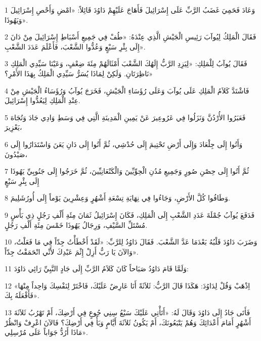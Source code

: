 \par 1 وَعَادَ فَحَمِيَ غَضَبُ الرَّبِّ عَلَى إِسْرَائِيلَ فَأَهَاجَ عَلَيْهِمْ دَاوُدَ قَائِلاً: «امْضِ وَأَحْصِ إِسْرَائِيلَ وَيَهُوذَا».
\par 2 فَقَالَ الْمَلِكُ لِيُوآبَ رَئِيسِ الْجَيْشِ الَّذِي عِنْدَهُ: «طُفْ فِي جَمِيعِ أَسْبَاطِ إِسْرَائِيلَ مِنْ دَانَ إِلَى بِئْرِ سَبْعٍ وَعُدُّوا الشَّعْبَ، فَأَعْلَمَ عَدَدَ الشَّعْبِ».
\par 3 فَقَالَ يُوآبُ لِلْمَلِكِ: «لِيَزِدِ الرَّبُّ إِلَهُكَ الشَّعْبَ أَمْثَالَهُمْ مِئَةَ ضِعْفٍ، وَعَيْنَا سَيِّدِي الْمَلِكِ نَاظِرَتَانِ. وَلَكِنْ لِمَاذَا يُسَرُّ سَيِّدِي الْمَلِكُ بِهَذَا الأَمْرِ؟»
\par 4 فَاشْتَدَّ كَلاَمُ الْمَلِكِ عَلَى يُوآبَ وَعَلَى رُؤَسَاءِ الْجَيْشِ، فَخَرَجَ يُوآبُ وَرُؤَسَاءُ الْجَيْشِ مِنْ عِنْدِ الْمَلِكِ لِيَعُدُّوا إِسْرَائِيلَ.
\par 5 فَعَبَرُوا الأُرْدُنَّ وَنَزَلُوا فِي عَرُوعِيرَ عَنْ يَمِينِ الْمَدِينَةِ الَّتِي فِي وَسَطِ وَادِي جَادَ وَتُجَاهَ يَعْزِيرَ،
\par 6 وَأَتُوا إِلَى جِلْعَادَ وَإِلَى أَرْضِ تَحْتِيمَ إِلَى حُدْشِي، ثُمَّ أَتُوا إِلَى دَانِ يَعَنَ وَاسْتَدَارُوا إِلَى صَيْدُونَ،
\par 7 ثُمَّ أَتُوا إِلَى حِصْنِ صُورٍ وَجَمِيعِ مُدُنِ الْحِوِّيِّينَ وَالْكَنْعَانِيِّينَ، ثُمَّ خَرَجُوا إِلَى جَنُوبِيِّ يَهُوذَا إِلَى بِئْرِ سَبْعٍ
\par 8 وَطَافُوا كُلَّ الأَرْضِ، وَجَاءُوا فِي نِهَايَةِ تِسْعَةِ أَشْهُرٍ وَعِشْرِينَ يَوْماً إِلَى أُورُشَلِيمَ.
\par 9 فَدَفَعَ يُوآبُ جُمْلَةَ عَدَدِ الشَّعْبِ إِلَى الْمَلِكِ، فَكَانَ إِسْرَائِيلُ ثَمَانَ مِئَةِ أَلْفِ رَجُلٍ ذِي بَأْسٍ مُسْتَلِّ السَّيْفِ، وَرِجَالُ يَهُوذَا خَمْسَ مِئَةِ أَلْفِ رَجُلٍ.
\par 10 وَضَرَبَ دَاوُدَ قَلْبُهُ بَعْدَمَا عَدَّ الشَّعْبَ. فَقَالَ دَاوُدُ لِلرَّبِّ: «لَقَدْ أَخْطَأْتُ جِدّاً فِي مَا فَعَلْتُ، وَالآنَ يَا رَبُّ أَزِلْ إِثْمَ عَبْدِكَ لأَنِّي انْحَمَقْتُ جِدّاً».
\par 11 وَلَمَّا قَامَ دَاوُدُ صَبَاحاً كَانَ كَلاَمُ الرَّبِّ إِلَى جَادٍ النَّبِيِّ رَائِي دَاوُدَ:
\par 12 «اِذْهَبْ وَقُلْ لِدَاوُدَ: هَكَذَا قَالَ الرَّبُّ: ثَلاَثَةً أَنَا عَارِضٌ عَلَيْكَ، فَاخْتَرْ لِنَفْسِكَ وَاحِداً مِنْهَا فَأَفْعَلَهُ بِكَ».
\par 13 فَأَتَى جَادُ إِلَى دَاوُدَ وَقَالَ لَهُ: «أَتَأْتِي عَلَيْكَ سَبْعُ سِنِي جُوعٍ فِي أَرْضِكَ، أَمْ تَهْرُبُ ثَلاَثَةَ أَشْهُرٍ أَمَامَ أَعْدَائِكَ وَهُمْ يَتْبَعُونَكَ، أَمْ يَكُونُ ثَلاَثَةَ أَيَّامٍ وَبَأٌ فِي أَرْضِكَ؟ فَالآنَ اعْرِفْ وَانْظُرْ مَاذَا أَرُدُّ جَوَاباً عَلَى مُرْسِلِي».

